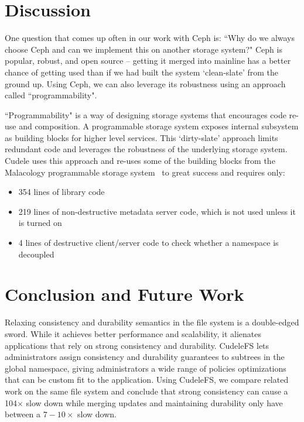 \section{Discussion}

One question that comes up often in our work with Ceph is: ``Why do we always
choose Ceph and can we implement this on another storage system?" Ceph is
popular, robust, and open source -- getting it merged into mainline has a
better chance of getting used than if we had built the system `clean-slate'
from the ground up. Using Ceph, we can also leverage its robustness using an
approach called ``programmability".

``Programmability" is a way of designing storage systems that encourages code
re-use and composition.  A programmable storage system exposes internal
subsystem as building blocks for higher level services. This `dirty-slate'
approach limits redundant code and leverages the robustness of the underlying
storage system. Cudele uses this approach and re-uses some of the building
blocks from the Malacology programmable storage system~\cite{sevilla:eurosys17}
to great success and requires only:

\begin{itemize}

  \item 354 lines of library code

  \item 219 lines of non-destructive metadata server code, which is not used
  unless it is turned on

  \item 4 lines of destructive client/server code to check whether a namespace
  is decoupled

\end{itemize}

\section{Conclusion and Future Work}

Relaxing consistency and durability semantics in the file system is a
double-edged sword. While it achieves better performance and scalability, it
alienates applications that rely on strong consistency and durability. CudeleFS
lets administrators assign consistency and durability guarantees to subtrees in
the global namespace, giving administrators a wide range of policies
optimizations that can be custom fit to the application. Using CudeleFS, we
compare related work on the same file system and conclude that strong
consistency can cause a 104\(\times\) slow down while merging updates and
maintaining durability only have between a \(7-10\times\) slow down.



